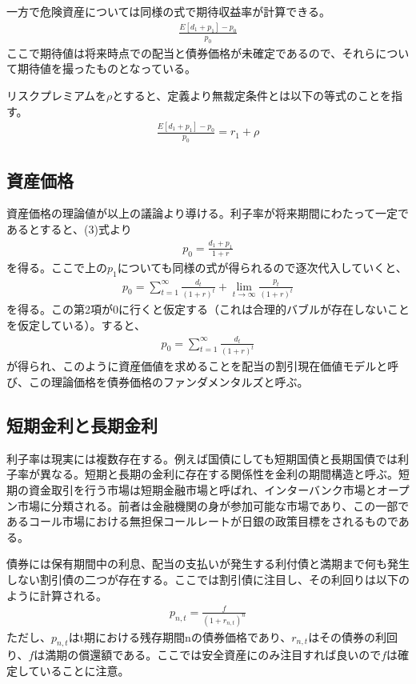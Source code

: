 \documentclass{jsarticle}
\begin{document}
一方で危険資産については同様の式で期待収益率が計算できる。
\begin{align}
	\frac{E[d_1 + p_1] -p_0}{p_0}
\end{align}
ここで期待値は将来時点での配当と債券価格が未確定であるので、それらについて期待値を撮ったものとなっている。

リスクプレミアムを$\rho$とすると、定義より無裁定条件とは以下の等式のことを指す。
\begin{align}
	\frac{E[d_1 + p_1] -p_0}{p_0} = r_1 + \rho
\end{align}

\subsection{資産価格}
資産価格の理論値が以上の議論より導ける。利子率が将来期間にわたって一定であるとすると、(3)式より
\begin{align}
	p_0 = \frac{d_1 + p_1}{1 + r}
\end{align}
を得る。ここで上の$p_1$についても同様の式が得られるので逐次代入していくと、
\begin{align*}
	p_0 = \sum_{t = 1}^{\infty} \frac{d_t}{(1+ r)^t} + \lim_{t \to \infty} \frac{p_t}{(1 + r)^t}
\end{align*}
を得る。この第2項が0に行くと仮定する（これは合理的バブルが存在しないことを仮定している）。すると、
\begin{align}
	p_0 = \sum_{t = 1}^{\infty} \frac{d_t}{(1+ r)^t}
\end{align}
が得られ、このように資産価値を求めることを配当の割引現在価値モデルと呼び、この理論価格を債券価格のファンダメンタルズと呼ぶ。

\subsection{短期金利と長期金利}
利子率は現実には複数存在する。例えば国債にしても短期国債と長期国債では利子率が異なる。短期と長期の金利に存在する関係性を金利の期間構造と呼ぶ。短期の資金取引を行う市場は短期金融市場と呼ばれ、インターバンク市場とオープン市場に分類される。前者は金融機関の身が参加可能な市場であり、この一部であるコール市場における無担保コールレートが日銀の政策目標をされるものである。

債券には保有期間中の利息、配当の支払いが発生する利付債と満期まで何も発生しない割引債の二つが存在する。ここでは割引債に注目し、その利回りは以下のように計算される。
\begin{align}
	p_{n, t} = \frac{f}{(1 + r_{n, t})^n}
\end{align}
ただし、$p_{n, t}$はt期における残存期間nの債券価格であり、$r_{n, t}$はその債券の利回り、$f$は満期の償還額である。ここでは安全資産にのみ注目すれば良いので$f$は確定していることに注意。
\end{document}
